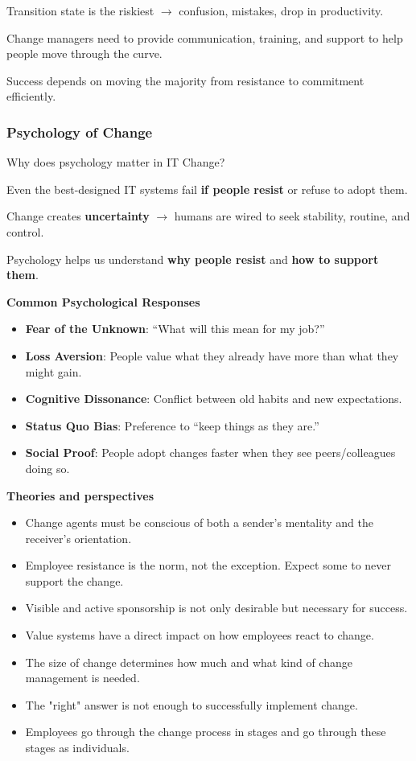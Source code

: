 \indent 

Transition state is the riskiest $\xrightarrow{}$ confusion, mistakes, drop in productivity.

Change managers need to provide communication, training, and support to help people move through the curve.

Success depends on moving the majority from resistance to commitment efficiently.

\subsubsection{Psychology of Change}

\noindent Why does psychology matter in IT Change?

Even the best-designed IT systems fail \textbf{if people resist} or refuse to adopt them.

Change creates \textbf{uncertainty} $\xrightarrow{}$ humans are wired to seek stability, routine, and control.

Psychology helps us understand \textbf{why people resist} and \textbf{how to support them}.

\bigskip

\noindent \textbf{Common Psychological Responses}

\begin{itemize}
    \item \textbf{Fear of the Unknown}: “What will this mean for my job?”
    \item \textbf{Loss Aversion}: People value what they already have more than what they might gain.
    \item \textbf{Cognitive Dissonance}: Conflict between old habits and new expectations.
    \item \textbf{Status Quo Bias}: Preference to “keep things as they are.”
    \item \textbf{Social Proof}: People adopt changes faster when they see peers/colleagues doing so.
\end{itemize}

\bigskip

\noindent\textbf{Theories and perspectives}

\begin{itemize}
    \item Change agents must be conscious of both a sender's mentality and the receiver's orientation.
    \item Employee resistance is the norm, not the exception. Expect some to never support the change.
    \item Visible and active sponsorship is not only desirable but necessary for success.
    \item Value systems have a direct impact on how employees react to change.
    \item The size of change determines how much and what kind of change management is needed.
    \item The "right" answer is not enough to successfully implement change.
    \item Employees go through the change process in stages and go through these stages as individuals.
\end{itemize}

